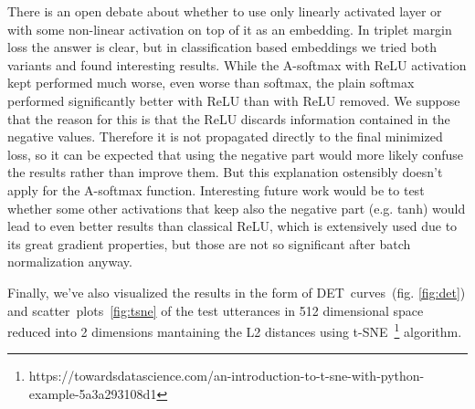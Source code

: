\medskip
There is an open debate about whether to use only linearly activated layer or with some non-linear activation on top of it as an embedding. In triplet margin loss the answer is clear, but in classification based embeddings we tried both variants and found interesting results. While the A-softmax with ReLU activation kept performed much worse, even worse than softmax, the plain softmax performed significantly better with ReLU than with ReLU removed. We suppose that the reason for this is that the ReLU discards information contained in the negative values. Therefore it is not propagated directly to the final minimized loss, so it can be expected that using the negative part would more likely confuse the results rather than improve them. But this explanation ostensibly doesn't apply for the A-softmax function. Interesting future work would be to test whether some other activations that keep also the negative part (e.g. tanh) would lead to even better results than classical ReLU, which is extensively used due to its great gradient properties, but those are not so significant after batch normalization anyway.

\medskip
Finally, we've also visualized the results in the form of DET~curves~(fig. \ref{fig:det}) and scatter~plots~\ref{fig:tsne} of the test utterances in 512 dimensional space reduced into 2 dimensions mantaining the L2 distances using t-SNE~\footnote{https://towardsdatascience.com/an-introduction-to-t-sne-with-python-example-5a3a293108d1} algorithm.

